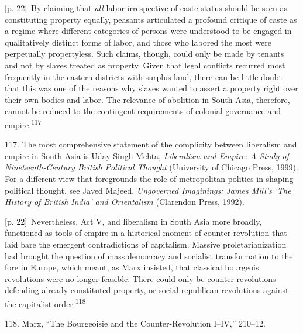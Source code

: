 \documentclass[10pt,a4paper]{article}
\begin{document}
{\scriptsize\color{gray} [p. 22]}\ By claiming that \textit{all} labor irrespective of caste status should be seen as constituting property equally, peasants articulated a profound critique of caste as a regime where different categories of persons were understood to be engaged in qualitatively distinct forms of labor, and those who labored the most were perpetually propertyless. Such claims, though, could only be made by tenants and not by slaves treated as property. Given that legal conflicts recurred most frequently in the eastern districts with surplus land, there can be little doubt that this was one of the reasons why slaves wanted to assert a property right over their own bodies and labor. The relevance of abolition in South Asia, therefore, cannot be reduced to the contingent requirements of colonial governance and empire.\nobreak\textsuperscript{117}\par{\small 117. The most comprehensive statement of the complicity between liberalism and empire in South Asia is Uday Singh Mehta, \textit{Liberalism and Empire: A Study of Nineteenth-Century British Political Thought} (University of Chicago Press, 1999). For a different view that foregrounds the role of metropolitan politics in shaping political thought, see Javed Majeed, \textit{Ungoverned Imaginings: James Mill’s ‘The History of British India’ and Orientalism} (Clarendon Press, 1992).\par}
{\scriptsize\color{gray} [p. 22]}\ Nevertheless, Act V, and liberalism in South Asia more broadly, functioned as tools of empire in a historical moment of counter-revolution that laid bare the emergent contradictions of capitalism. Massive proletarianization had brought the question of mass democracy and socialist transformation to the fore in Europe, which meant, as Marx insisted, that classical bourgeois revolutions were no longer feasible. There could only be counter-revolutions defending already constituted property, or social-republican revolutions against the capitalist order.\nobreak\textsuperscript{118}\par{\small 118. Marx, “The Bourgeoisie and the Counter-Revolution I–IV,” 210–12.\par}
\end{document}
